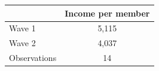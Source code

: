 \begin{tabular}{lc}
\toprule
 & Income per member \\
\midrule
Wave 1 & 5,115 \\
Wave 2 & 4,037 \\
\midrule
Observations & 14 \\
\bottomrule
\end{tabular}

